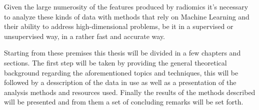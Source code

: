 Given the large numerosity of the features produced by radiomics it's necessary to analyze these kinds of data with methods that rely on Machine Learning and their ability to address high-dimensional problems, be it in a supervised or unsupervised way, in a rather fast and accurate way.

Starting from these premises this thesis will be divided in a few chapters and sections. The first step will be taken by providing the general theoretical background regarding the aforementioned topics and techniques, this will be followed by a desscription of the data in use as well as a presentation of the analysis methods and resources used. Finally the results of the methods described will be presented and from them a set of concluding remarks will be set forth.
